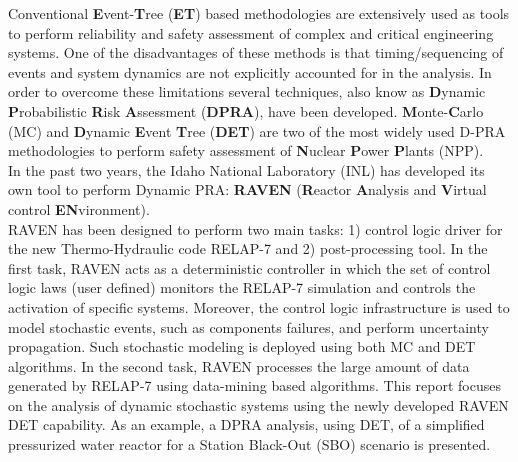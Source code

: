
Conventional \textbf{E}vent-\textbf{T}ree (\textbf{ET}) based methodologies are extensively used as tools to perform reliability and safety assessment of complex and critical engineering systems.
One of the disadvantages of these methods is that timing/sequencing of events and system dynamics are not explicitly accounted for in the analysis.
In order to overcome these limitations several techniques, also know as \textbf{D}ynamic \textbf{P}robabilistic \textbf{R}isk \textbf{A}ssessment (\textbf{DPRA}), have been developed. \textbf{M}onte-\textbf{C}arlo (MC) and \textbf{D}ynamic \textbf{E}vent \textbf{T}ree (\textbf{DET}) are two of the most widely used D-PRA methodologies to perform safety assessment of \textbf{N}uclear \textbf{P}ower \textbf{P}lants (NPP).
\\In the past two years, the Idaho National Laboratory (INL) has developed its own tool to perform Dynamic PRA: \textbf{RAVEN} (\textbf{R}eactor \textbf{A}nalysis and \textbf{V}irtual control \textbf{EN}vironment).
\\RAVEN has been designed to perform two main tasks: 1) control logic driver for the new Thermo-Hydraulic code RELAP-7 and 2) post-processing tool.
In the first task, RAVEN acts as a deterministic controller in which the set of control logic laws (user defined) monitors the RELAP-7 simulation and controls the activation of specific systems.
Moreover, the control logic infrastructure is used to model stochastic events, such as components failures, and perform uncertainty propagation. Such stochastic modeling is deployed using both MC and DET algorithms. In the second task, RAVEN processes the large amount of data generated by RELAP-7 using data-mining based algorithms. This report focuses on the analysis of dynamic stochastic systems using the newly developed RAVEN DET capability. As an example, a DPRA analysis, using DET, of a simplified pressurized water reactor for a Station Black-Out (SBO) scenario is presented.

